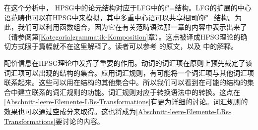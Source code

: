 在这个分析中， HPSG中的论元结构对应于LFG中的f"=结构。LFG\indexlfgc 的扩展的中心语范畴也可以在HPSG中来模拟，其中多重中心语可以共享相同的f"=结构。为此，我们可以利用函数组合，因为它在有关范畴语法\indexcgc 那一章的内容中表示出来了（请参阅第\ref{Kategorialgrammatik-Komposition}章）。这点被译成HPSG理论的确切方式限于篇幅就不在这里解释了。读者可以参考 \citet{HN94a}的原文，以及 中的解释。

配价信息在HPSG理论中发挥了重要的作用。动词的词汇项在原则上预先裁定了该词汇项可以出现的结构的集合。应用词汇规则，有可能将一个词汇项与其他词汇项联系起来。这些可以用在结构的其他集合中。所以我们可以看到在可能的结构的集合中建立联系的词汇规则的功能。词汇规则对应于转换语法中的转换。这点在\ref{Abschnitt-leere-Elemente-LRs-Transformations}有更为详细的讨论。词汇规则的效果也可以通过空成分来取得。这也将成为\ref{Abschnitt-leere-Elemente-LRs-Transformations}要讨论的内容。

